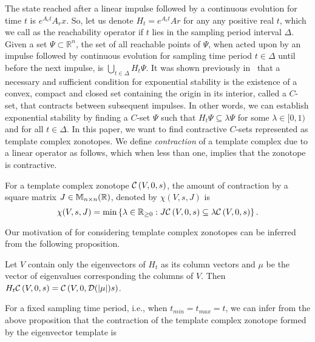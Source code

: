 
The state reached after a linear impulse followed by a continuous
evolution for time $t$ is $e^{A_ct}A_rx$.  So, let us denote
$H_t=e^{A_ct}Ar$ for any any positive real $t$, which we call as the
reachability operator if $t$ lies in the sampling period interval
$\Delta$.  Given a set $\Psi\subset\mathbb{R}^n$, the set of all
reachable points of $\Psi$, when acted upon by an impulse followed by
continuous evolution for sampling time period $t\in\Delta$ until
before the next impulse, is $\bigcup_{t\in\Delta}H_t\Psi$.  It was
shown previously in~\cite{2014-fiacchini-set,AlKhatib2015} that a
necessary and sufficient condition for exponential stability is the
existence of a convex, compact and closed set containing the origin in
its interior, called a $C$-set, that contracts between subsequent
impulses.  In other words, we can establish exponential stability by
finding a $C$-set $\Psi$ such that $H_t\Psi\subseteq\lambda\Psi$ for
some $\lambda\in[0,1)$ and for all $t\in\Delta$.  In this paper, we
  want to find contractive $C$-sets represented as template complex
  zonotopes.  We define \emph{contraction} of a
template complex due to a linear operator as follows, which when less
than one, implies that the zonotope is contractive.
%
\begin{defn}
For a template complex zonotope $\mathcal{C}\left(V,0,s\right)$, the amount of contraction by a
square matrix $J\in\mathbb{M}_{n\times n}(\mathbb{R})$, denoted by $\chi(V,s,J)$
is \[\chi(V,s,J)=\min\left\{\lambda\in\mathbb{R}_{\geq 0}:J\mathcal{C}\left(V,0,s\right)\subseteq
\lambda\mathcal{C}\left(V,0,s\right)\right\}.\]
\end{defn}
%
Our motivation of for considering
template complex zonotopes can be
inferred from the following proposition.  
%
\begin{prop}
  Let $V$ contain only the eigenvectors of $H_t$ as its column vectors
  and $\mu$ be the vector of eigenvalues corresponding the columns of
  $V$.  Then $H_t\mathcal{C}\left(V,0,s\right)=\mathcal{C}\left(V,0,\mathcal{D}(|\mu|)s\right)$.
\end{prop}
%
For a fixed sampling time period, i.e., when $t_{min}=t_{max}=t$, we
can infer from the above proposition that the contraction of the
template complex zonotope formed by the eigenvector template is
